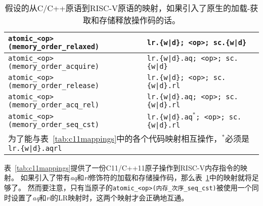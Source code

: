 \begin{table}[h!]
\begin{tabular}{|l|l|}
    \hline
    \tt atomic\_<op>(memory\_order\_relaxed)  & \tt lr.\{w|d\}; <op>; sc.\{w|d\} \\
    \hline
    \tt atomic\_<op>(memory\_order\_acquire)  & \tt lr.\{w|d\}.aq; <op>; sc.\{w|d\} \\
    \hline
    \tt atomic\_<op>(memory\_order\_release)  & \tt lr.\{w|d\}; <op>; sc.\{w|d\}.rl \\
    \hline
    \tt atomic\_<op>(memory\_order\_acq\_rel) & \tt lr.\{w|d\}.aq; <op>; sc.\{w|d\}.rl \\
    \hline
    \tt atomic\_<op>(memory\_order\_seq\_cst) & \tt lr.\{w|d\}.aq$^*$; <op>; sc.\{w|d\}.rl \\
    \hline
    \multicolumn{2}{l}{为了能与表~\ref{tab:c11mappings}中的各个代码映射相互操作，$^*$必须是{\tt lr.\{w|d\}.aqrl}  
    }
  \end{tabular}
  \caption{假设的从C/C++原语到RISC-V原语的映射，如果引入了原生的加载-获取和存储释放操作码的话。
    }
  \label{tab:c11mappings_hypothetical}
\end{table}

表~\ref{tab:c11mappings}提供了一份C11/C++11原子操作到RISC-V内存指令的映射。
如果引入了带有{\em aq}和{\em rl}修饰符的加载和存储操作码，那么表~\ref{tab:c11mappings_hypothetical}中的映射就将足够了。
然而要注意，只有当原子的{\tt atomic\_<op>(内存\_次序\_seq\_cst)}被使用一个同时设置了{\em aq}和{\em rl}的LR映射时，这两个映射才会正确地互通。

